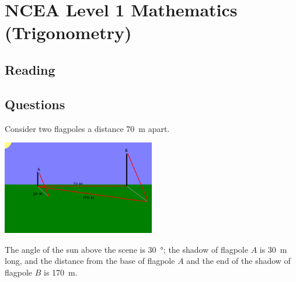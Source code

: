 \documentclass{exam}
\begin{document}
\section*{NCEA Level 1 Mathematics (Trigonometry)}

\subsection*{Reading}
\subsection*{Questions}
\begin{questions}

\question Consider two flagpoles a distance \SI{70}{\metre} apart.
          \begin{center}
            \includegraphics[width=0.5\textwidth]{flagpoles}
          \end{center}
          The angle of the sun above the scene is \SI{30}{\degree}; the shadow of flagpole $ A $ is \SI{30}{\metre} long, and
          the distance from the base of flagpole $ A $ and the end of the shadow of flagpole $ B $ is \SI{170}{\metre}.


\end{questions}
\end{document}
